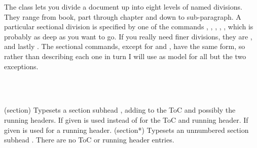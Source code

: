     The \theclass{} class lets you divide a document up into eight levels
of named divisions. They range from book, part
through chapter and down to
sub-paragraph. A particular sectional division is specified by one of
the commands \cmd{\book}, \cmd{\part}, \cmd{\chapter}, \cmd{\section},
\cmd{\subsection},
which is probably as deep as you want to go. If you really need finer
divisions, they are
 \cmd{\subsubsection}, \cmd{\paragraph} and lastly \cmd{\subparagraph}.
The sectional commands, except for \cmd{\book} and \cmd{\part},
have the same form, so rather than describing
each one in turn I will use \cmd{\section} as model for all but the
two exceptions.

\begin{syntax}
\cmd{\section}\\
\cmd{\section*}\\
\end{syntax}
\glossary(section)%
  {}%
  {Typesets a section subhead , adding  to the ToC and
   possibly the running headers. If given 
   is used instead of  for the ToC and running header. If given
    is used for a running header.}
\glossary(section*)%
  {}%
  {Typesets an unnumbered section subhead . There are no ToC or
   running header entries.}

